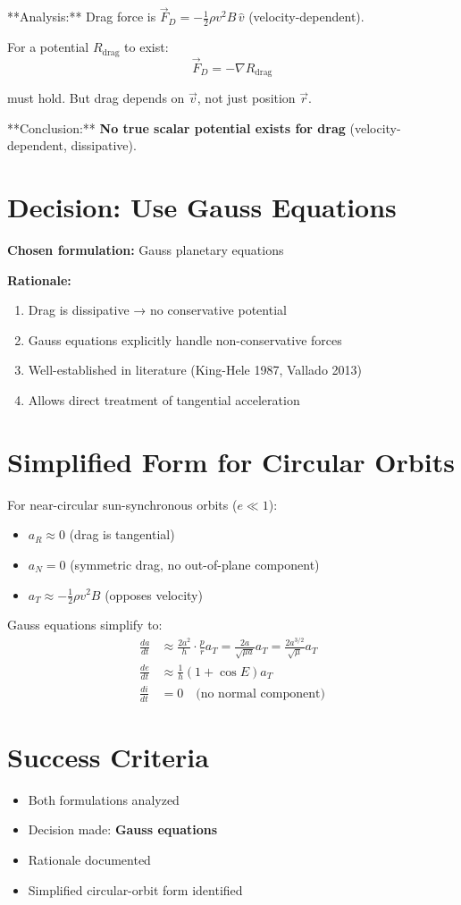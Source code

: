 \documentclass[11pt]{article}
\begin{document}
**Analysis:** Drag force is $\vec{F}_D = -\frac{1}{2}\rho v^2 B\,\hat{v}$ (velocity-dependent).

For a potential $R_{\text{drag}}$ to exist:
\begin{equation}
\vec{F}_D = -\nabla R_{\text{drag}}
\end{equation}

must hold. But drag depends on $\vec{v}$, not just position $\vec{r}$.

**Conclusion:** \textbf{No true scalar potential exists for drag} (velocity-dependent, dissipative).

\section{Decision: Use Gauss Equations}

\textbf{Chosen formulation:} Gauss planetary equations

\textbf{Rationale:}
\begin{enumerate}
    \item Drag is dissipative → no conservative potential
    \item Gauss equations explicitly handle non-conservative forces
    \item Well-established in literature (King-Hele 1987, Vallado 2013)
    \item Allows direct treatment of tangential acceleration
\end{enumerate}

\section{Simplified Form for Circular Orbits}

For near-circular sun-synchronous orbits ($e \ll 1$):
\begin{itemize}
    \item $a_R \approx 0$ (drag is tangential)
    \item $a_N = 0$ (symmetric drag, no out-of-plane component)
    \item $a_T \approx -\frac{1}{2}\rho v^2 B$ (opposes velocity)
\end{itemize}

Gauss equations simplify to:
\begin{align}
\frac{da}{dt} &\approx \frac{2a^2}{h} \cdot \frac{p}{r} a_T = \frac{2a}{\sqrt{\mu a}} a_T = \frac{2a^{3/2}}{\sqrt{\mu}} a_T\\
\frac{de}{dt} &\approx \frac{1}{h}(1 + \cos E) a_T\\
\frac{di}{dt} &= 0 \quad \text{(no normal component)}
\end{align}

\section{Success Criteria}
\begin{itemize}
    \item[$\checkmark$] Both formulations analyzed
    \item[$\checkmark$] Decision made: \textbf{Gauss equations}
    \item[$\checkmark$] Rationale documented
    \item[$\checkmark$] Simplified circular-orbit form identified
\end{itemize}
\end{document}
